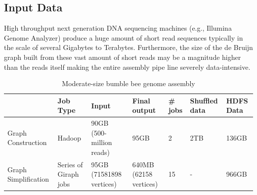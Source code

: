 \documentclass[conference]{IEEEtran}
\begin{document}
\subsection {Input Data} \label{InputData}
High throughput next generation DNA sequencing machines (e.g., Illumina Genome Analyzer) produce a huge amount of short read sequences typically in the scale of several Gigabytes to Terabytes.
Furthermore, the size of the de Bruijn graph built from these vast amount of short reads may be a magnitude higher than the reads itself making the entire assembly pipe line severely data-intensive.
\begin{table}
\begin{center}
    \begin{tabular}{ |p{1.1cm} | p{0.8cm} | p{1.1cm} | p{0.8cm} | p{0.8cm} | p{0.8cm} | p{0.8cm}|} \hline
    & Job Type & Input & Final output & \# jobs & Shuffled data & HDFS Data \\ \hline
    Graph Construction & Hadoop & 90GB (500-million reads) & 95GB & 2 & 2TB & 136GB \\ \hline
    Graph Simplification & Series of Giraph jobs & 95GB (71581898 vertices) & 640MB (62158 vertices) & 15 & - & 966GB \\ \hline
    \end{tabular}
    \caption{Moderate-size bumble bee genome assembly}
	\label{table:BumbleBeeData}
\end{center}
\vspace{-3.0em}
\end{table}
\end{document}
